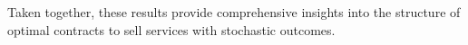 Taken together, these results provide comprehensive insights into the structure of optimal contracts to sell services with stochastic outcomes.









